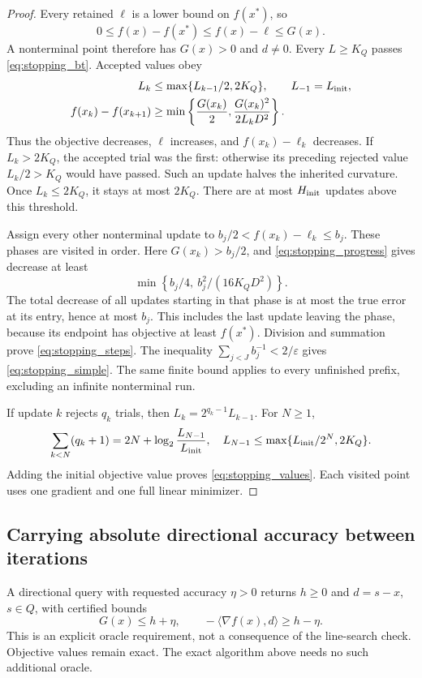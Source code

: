 \begin{proof}
Every retained $\ell$ is a lower bound on $f(x^*)$, so
\[
 0\le f(x)-f(x^*)\le f(x)-\ell\le G(x).
\]
A nonterminal point therefore has $G(x)>0$ and $d\ne0$.
Every $L\ge K_Q$ passes \eqref{eq:stopping_bt}. Accepted values obey
\begin{equation}\label{eq:stopping_progress}
 \begin{split}
 L_k&\le\max\{L_{k-1}/2,2K_Q\},\qquad L_{-1}=L_{\rm init},\\
 f(x_k)-f(x_{k+1})&\ge
 \min\left\{\frac{G(x_k)}2,\frac{G(x_k)^2}{2L_kD^2}\right\}.
 \end{split}
\end{equation}
Thus the objective decreases, $\ell$ increases, and $f(x_k)-\ell_k$
decreases. If $L_k>2K_Q$, the accepted trial was the first: otherwise
its preceding rejected value $L_k/2>K_Q$ would have passed.
Such an update halves the inherited curvature. Once $L_k\le2K_Q$,
it stays at most $2K_Q$. There are at most $H_{\rm init}$ updates
above this threshold.

Assign every other nonterminal update to
$b_j/2<f(x_k)-\ell_k\le b_j$. These phases are visited in order.
Here $G(x_k)>b_j/2$, and \eqref{eq:stopping_progress} gives decrease
at least
\[
 \min\left\{b_j/4,\ b_j^2/(16K_QD^2)\right\}.
\]
The total decrease of all updates starting in that phase is at most
the true error at its entry, hence at most $b_j$. This includes the
last update leaving the phase, because its endpoint has objective
at least $f(x^*)$. Division and summation prove
\eqref{eq:stopping_steps}. The inequality
$\sum_{j<J}b_j^{-1}<2/\varepsilon$ gives
\eqref{eq:stopping_simple}. The same finite bound applies to every
unfinished prefix, excluding an infinite nonterminal run.

If update $k$ rejects $q_k$ trials, then
$L_k=2^{q_k-1}L_{k-1}$. For $N\ge1$,
\[
 \sum_{k<N}(q_k+1)=2N+\log_2\frac{L_{N-1}}{L_{\rm init}},
 \quad L_{N-1}\le\max\{L_{\rm init}/2^N,2K_Q\}.
\]
Adding the initial objective value proves \eqref{eq:stopping_values}.
Each visited point uses one gradient and one full linear minimizer.
\end{proof}

\subsection{Carrying absolute directional accuracy between iterations}
A directional query with requested accuracy $\eta>0$ returns $h\ge0$
and $d=s-x$, $s\in Q$, with certified bounds
\begin{equation}\label{eq:directional_query}
 G(x)\le h+\eta,\qquad
 -\langle\nabla f(x),d\rangle\ge h-\eta.
\end{equation}
This is an explicit oracle requirement, not a consequence of the line-search
check. Objective values remain exact. The exact algorithm above needs
no such additional oracle.


